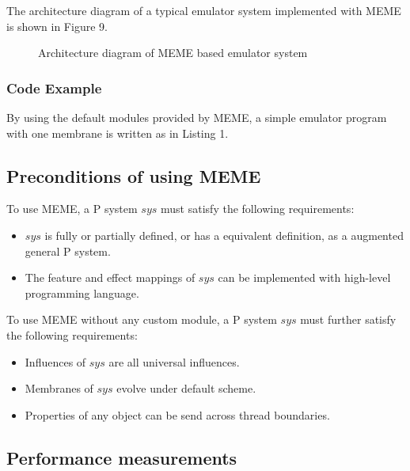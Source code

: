 \documentclass[9pt,a4paper,twoside]{article}
\newcommand\figpath{./paper/assets/figures/}
\newcommand\codepath{./paper/src/codes/}
\begin{document}
        The architecture diagram of a typical emulator system implemented with MEME is shown in Figure 9.
        \begin{figure}[!htbp]
            \centering
            
            \caption{Architecture diagram of MEME based emulator system}
            \label{fig:fig9}
        \end{figure}

        \subsubsection{Code Example}
        By using the default modules provided by MEME, a simple emulator program with one membrane is written as in Listing 1.
        
        

    \subsection{Preconditions of using MEME}
    To use MEME, a P system $sys$ must satisfy the following requirements:
    \begin{itemize}
        \item $sys$ is fully or partially defined, or has a equivalent definition, as a augmented general P system.
        \item The feature and effect mappings of $sys$ can be implemented with high-level programming language.
    \end{itemize}

    To use MEME without any custom module, a P system $sys$ must further satisfy the following requirements:
     \begin{itemize}
        \item Influences of $sys$ are all universal influences.
        \item Membranes of $sys$ evolve under default scheme.
        \item Properties of any object can be send across thread boundaries.
    \end{itemize}

    \subsection{Performance measurements}
    
\end{document}
